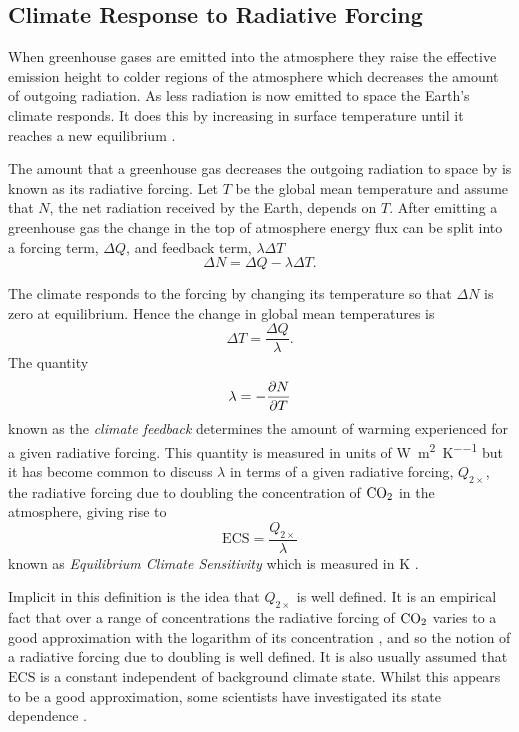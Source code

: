 \subsection{Climate Response to Radiative Forcing}
When greenhouse gases are emitted into the atmosphere they raise the effective emission height to colder regions of the atmosphere which
decreases the amount of outgoing radiation. As less radiation is now emitted to space the Earth's climate responds. It does this by increasing in surface temperature
until it reaches a new equilibrium \parencite{Manabe1967,Pierrehumbert2010}. 

The amount that a greenhouse gas decreases the outgoing radiation to space by is known as its radiative forcing. Let $T$ be
the global mean temperature and assume that $N$, the net radiation received by the Earth, depends on $T$. After emitting a greenhouse gas
the change in the top of atmosphere energy flux can be split \parencite{Gregory2004} into a forcing term, $\Delta Q$, and feedback term, $\lambda \Delta T$
\begin{equation}
  \label{eq:deltaN}
  \Delta N = \Delta Q - \lambda \Delta T.
\end{equation}

The climate responds to the forcing by changing its temperature so that $\Delta N$ is zero at equilibrium. Hence the change in global mean temperatures is
\begin{equation}
  \label{eq:response_to_radiative_forcing}
  \Delta T = \frac{\Delta Q}{\lambda}.
\end{equation}
The quantity
\begin{equation}
  \label{eq:climate_sensitivity}
  \lambda = -\pdv{N}{T}
\end{equation}
known as the \emph{climate feedback} determines the amount of warming experienced for a given radiative forcing. This quantity is measured
in units of \si{\watt\per\square\meter\per\kelvin} but it has become common to discuss $\lambda$ in terms of a given radiative forcing, $Q_{2\times}$,
the radiative forcing due to doubling the concentration of $\ce{CO2}$ in the atmosphere, giving rise to
\begin{equation}
  \label{eq:definition_of_ECS}
  \mathrm{ECS} = \frac{Q_{2\times}}{\lambda}
\end{equation}
known as \emph{Equilibrium Climate Sensitivity} which is measured in \si{\kelvin} \parencite{Charney1979}.

Implicit in this definition is the idea that $Q_{2\times}$ is well defined. It is an empirical fact that over a range of concentrations the radiative forcing
of $\ce{CO2}$ varies to a good approximation with the logarithm of its concentration \parencite{Pierrehumbert2010}, and so the notion of a radiative forcing due to doubling is well defined.
It is also usually assumed that $\mathrm{ECS}$ is a constant independent of background climate state. Whilst this appears to be a good approximation, some scientists
have investigated its state dependence \parencite{Ashwin2019,Caballero2013,Bloch-Johnson2021}.

